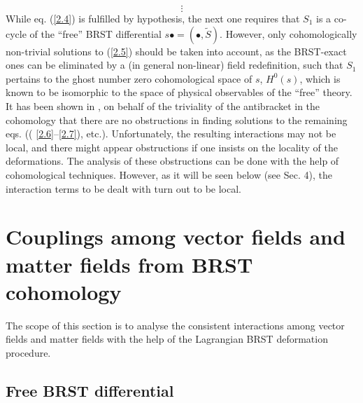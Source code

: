 \documentclass[a4paper,12pt]{article}
\begin{document}
\[
\vdots
\]
While eq. (\ref{2.4}) is fulfilled by
hypothesis, the next one requires that
$S_{1}$ is a co-cycle of the ``free''
BRST differential $s\bullet =\left(
\bullet ,\tilde{S}\right) $. However,
only cohomologically non-trivial
solutions to (\ref{2.5}) should be
taken into account, as the BRST-exact
ones can be eliminated by a (in general non-linear)
field redefinition, such
that $S_{1}$ pertains to the ghost number
zero cohomological space of $s$, $%
H^{0}\left( s\right) $, which is known to be
isomorphic to the space of
physical observables of the ``free'' theory.
It has been shown in \cite{3},
\cite{20} on behalf of the triviality of the
antibracket in the cohomology
that there are no obstructions in finding
solutions to the remaining eqs. ((%
\ref{2.6}--\ref{2.7}), etc.). Unfortunately,
the resulting interactions may
not be local, and there might appear
obstructions if one insists on the
locality of the deformations. The analysis
of these obstructions can be done
with the help of cohomological techniques.
However, as it will be seen below
(see Sec. 4), the interaction terms to be
dealt with turn out to be local.

\section{Couplings among vector fields and
matter fields from BRST cohomology}

The scope of this section is to analyse the
consistent interactions among
vector fields and matter fields with the help
of the Lagrangian BRST
deformation procedure.

\subsection{Free BRST differential}
\end{document}
